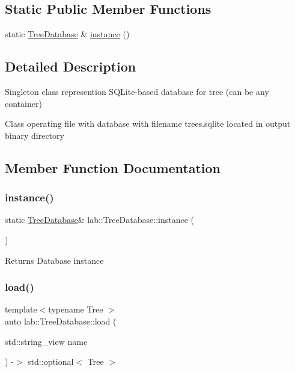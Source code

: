 \subsection*{Static Public Member Functions}
\begin{DoxyCompactItemize}
\item 
static \hyperlink{classlab_1_1TreeDatabase}{Tree\+Database} \& \hyperlink{classlab_1_1TreeDatabase_a0bc7dc24713be90902d3a58ed66a4d4d}{instance} ()
\end{DoxyCompactItemize}


\subsection{Detailed Description}
Singleton class represention S\+Q\+Lite-\/based database for tree (can be any container) 

Class operating file with database with filename trees.\+sqlite located in output binary directory 

\subsection{Member Function Documentation}
\mbox{\label{classlab_1_1TreeDatabase_a0bc7dc24713be90902d3a58ed66a4d4d}} 
\subsubsection{\texorpdfstring{instance()}{instance()}}
{\footnotesize\ttfamily static \hyperlink{classlab_1_1TreeDatabase}{Tree\+Database}\& lab\+::\+Tree\+Database\+::instance (\begin{DoxyParamCaption}{ }\end{DoxyParamCaption})\hspace{0.3cm}{\ttfamily [static]}}

\begin{DoxyReturn}{Returns}
Database instance 
\end{DoxyReturn}
\mbox{\label{classlab_1_1TreeDatabase_a9e8daa58f69152466d19cae774c073f1}} 
\subsubsection{\texorpdfstring{load()}{load()}}
{\footnotesize\ttfamily template$<$typename Tree $>$ \\
auto lab\+::\+Tree\+Database\+::load (\begin{DoxyParamCaption}\item[{std\+::string\+\_\+view}]{name }\end{DoxyParamCaption}) -\/$>$  std\+::optional$<$ Tree $>$}

